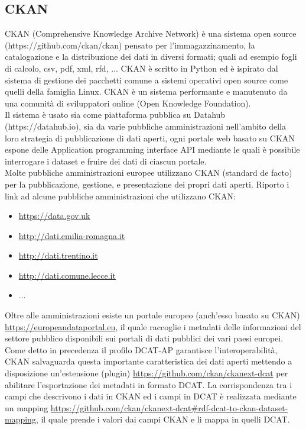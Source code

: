 \documentclass{article}
\theoremstyle{plain}
\theoremstyle{definition}
\begin{document}
\subsection{CKAN}
CKAN (Comprehensive Knowledge Archive Network) è una sistema open source (https://github.com/ckan/ckan) pensato per l'immagazzinamento, la catalogazione e la distribuzione dei dati in diversi formati; quali ad esempio fogli di calcolo, csv, pdf, xml, rfd, ... CKAN è scritto in Python ed è ispirato dal sistema di gestione dei pacchetti comune a sistemi operativi open source come quelli della famiglia Linux. CKAN è un sistema performante e manutenuto da una comunità di sviluppatori online (Open Knowledge Foundation).  
\\
Il sistema è usato sia come piattaforma pubblica su Datahub (https://datahub.io), sia da varie pubbliche amministrazioni nell'ambito della loro strategia di pubblicazione di dati aperti, ogni portale web basato su CKAN espone delle Application programming interface API mediante le quali è possibile interrogare i dataset e fruire dei dati di ciascun portale. 
\\
Molte pubbliche amministrazioni europee utilizzano CKAN (standard de facto) per la pubblicazione, gestione, e presentazione dei propri dati aperti. Riporto i link ad alcune pubbliche amministrazioni che utilizzano CKAN:
\begin{itemize}

\item \url{https://data.gov.uk}
\item \url{http://dati.emilia-romagna.it}
\item \url{http://dati.trentino.it}
\item \url{http://dati.comune.lecce.it}
\item ...
\end{itemize}
Oltre alle amministrazioni esiste un portale europeo (anch'esso basato su CKAN) \url{https://europeandataportal.eu}, il quale raccoglie i metadati delle informazioni del settore pubblico disponibili sui portali di dati pubblici dei vari paesi europei.
\\
Come detto in precedenza il profilo DCAT-AP garantisce l'interoperabilità, CKAN salvaguarda questa importante caratteristica dei dati aperti mettendo a disposizione un'estensione (plugin) \url{https://github.com/ckan/ckanext-dcat} per abilitare l'esportazione dei metadati in formato DCAT. La corrispondenza tra i campi che descrivono i dati in CKAN ed i campi in DCAT è realizzata mediante un mapping \url{https://github.com/ckan/ckanext-dcat#rdf-dcat-to-ckan-dataset-mapping}, il quale prende i valori dai campi CKAN e li mappa in quelli DCAT.
\end{document}

